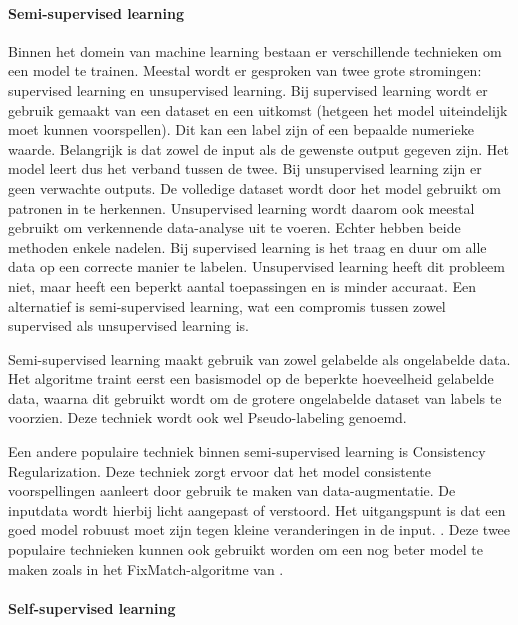 \paragraph{Semi-supervised learning}

Binnen het domein van machine learning bestaan er verschillende technieken om een model te trainen. Meestal wordt er gesproken van twee grote stromingen: supervised learning en unsupervised learning. Bij supervised learning wordt er gebruik gemaakt van een dataset en een uitkomst (hetgeen het model uiteindelijk moet kunnen voorspellen). Dit kan een label zijn of een bepaalde numerieke waarde. Belangrijk is dat zowel de input als de gewenste output gegeven zijn. Het model leert dus het verband tussen de twee. Bij unsupervised learning zijn er geen verwachte outputs. De volledige dataset wordt door het model gebruikt om patronen in te herkennen. Unsupervised learning wordt daarom ook meestal gebruikt om verkennende data-analyse uit te voeren. Echter hebben beide methoden enkele nadelen. Bij supervised learning is het traag en duur om alle data op een correcte manier te labelen. Unsupervised learning heeft dit probleem niet, maar heeft een beperkt aantal toepassingen en is minder accuraat. Een alternatief is semi-supervised learning, wat een compromis tussen zowel supervised als unsupervised learning is. \autocite{C_A_Padmanabha_Reddy_2018}

Semi-supervised learning maakt gebruik van zowel gelabelde als ongelabelde data. Het algoritme traint eerst een basismodel op de beperkte hoeveelheid gelabelde data, waarna dit gebruikt wordt om de grotere ongelabelde dataset van labels te voorzien. Deze techniek wordt ook wel Pseudo-labeling genoemd. \autocite{Lee_2013}

Een andere populaire techniek binnen semi-supervised learning is Consistency Regularization. Deze techniek zorgt ervoor dat het model consistente voorspellingen aanleert door gebruik te maken van data-augmentatie. De inputdata wordt hierbij licht aangepast of verstoord. Het uitgangspunt is dat een goed model robuust moet zijn tegen kleine veranderingen in de input. \autocite{Fan_2022}.
Deze twee populaire technieken kunnen ook gebruikt worden om een nog beter model te maken zoals in het FixMatch-algoritme van \textcite{Sohn_2020}.

\paragraph{Self-supervised learning}

